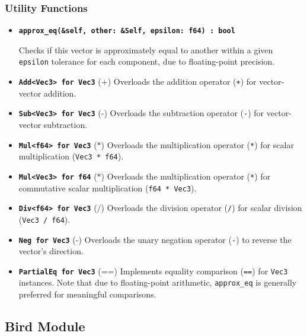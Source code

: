 \documentclass[12pt,a4paper]{article}
\begin{document}
\subsubsection{Utility Functions}
\begin{itemize}
    \item \textbf{\texttt{approx\_eq(\&self, other: \&Self, epsilon: f64) : bool}}
    
    Checks if this vector is approximately equal to another within a given \texttt{epsilon} tolerance for each component, due to floating-point precision.

    \item \textbf{\texttt{Add<Vec3> for Vec3}} ($\texttt{+}$)
    Overloads the addition operator (\texttt{+}) for vector-vector addition.

    \item \textbf{\texttt{Sub<Vec3> for Vec3}} ($\texttt{-}$)
    Overloads the subtraction operator (\texttt{-}) for vector-vector subtraction.

    \item \textbf{\texttt{Mul<f64> for Vec3}} ($\texttt{*}$)
    Overloads the multiplication operator (\texttt{*}) for scalar multiplication (\texttt{Vec3 * f64}).

    \item \textbf{\texttt{Mul<Vec3> for f64}} ($\texttt{*}$)
    Overloads the multiplication operator (\texttt{*}) for commutative scalar multiplication (\texttt{f64 * Vec3}).

    \item \textbf{\texttt{Div<f64> for Vec3}} ($\texttt{/}$)
    Overloads the division operator (\texttt{/}) for scalar division (\texttt{Vec3 / f64}).

    \item \textbf{\texttt{Neg for Vec3}} ($\texttt{-}$)
    Overloads the unary negation operator (\texttt{-}) to reverse the vector's direction.

    \item \textbf{\texttt{PartialEq for Vec3}} ($\texttt{==}$)
    Implements equality comparison (\texttt{==}) for \texttt{Vec3} instances. Note that due to floating-point arithmetic, \texttt{approx\_eq} is generally preferred for meaningful comparisons.
\end{itemize}

\subsection{Bird Module}
\end{document}
